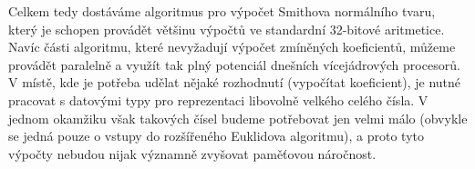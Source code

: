 Celkem tedy dostáváme algoritmus pro výpočet Smithova normálního tvaru, který
je schopen provádět většinu výpočtů ve standardní 32-bitové aritmetice. Navíc části
algoritmu, které nevyžadují výpočet zmíněných koeficientů, můžeme provádět
paralelně a využít tak plný potenciál dnešních vícejádrových procesorů.
V místě, kde je potřeba udělat nějaké rozhodnutí (vypočítat koeficient),
je nutné pracovat s datovými typy pro reprezentaci libovolně velkého celého
čísla. V jednom okamžiku však takových čísel budeme potřebovat jen velmi málo
(obvykle se jedná pouze o vstupy do rozšířeného Euklidova algoritmu), a proto
tyto výpočty nebudou nijak významně zvyšovat paměťovou náročnost.
